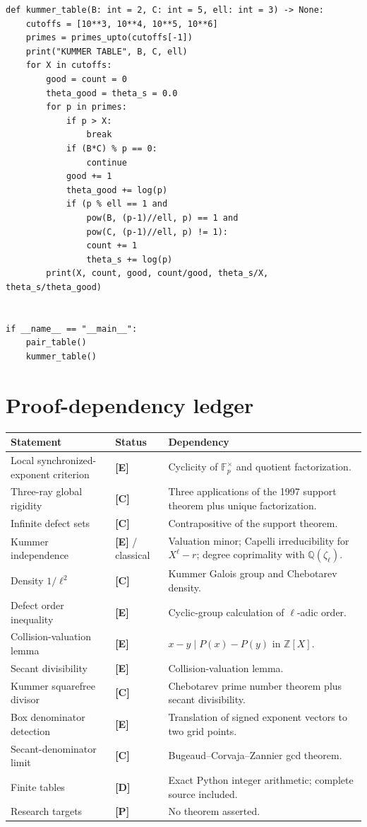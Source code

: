 \documentclass[11pt]{article}
\theoremstyle{definition}
\newcommand{\Z}{\mathbb Z}
\newcommand{\Q}{\mathbb Q}
\newcommand{\F}{\mathbb F}
\newcommand{\statusE}{\textcolor{deepgreen}{\textbf{[E]}}}
\newcommand{\statusC}{\textcolor{deepblue}{\textbf{[C]}}}
\newcommand{\statusD}{\textcolor{deepred}{\textbf{[D]}}}
\newcommand{\statusP}{\textcolor{orange!70!black}{\textbf{[P]}}}
\begin{document}
\begin{lstlisting}[style=pythonstyle]
def kummer_table(B: int = 2, C: int = 5, ell: int = 3) -> None:
    cutoffs = [10**3, 10**4, 10**5, 10**6]
    primes = primes_upto(cutoffs[-1])
    print("KUMMER TABLE", B, C, ell)
    for X in cutoffs:
        good = count = 0
        theta_good = theta_s = 0.0
        for p in primes:
            if p > X:
                break
            if (B*C) % p == 0:
                continue
            good += 1
            theta_good += log(p)
            if (p % ell == 1 and
                pow(B, (p-1)//ell, p) == 1 and
                pow(C, (p-1)//ell, p) != 1):
                count += 1
                theta_s += log(p)
        print(X, count, good, count/good, theta_s/X, theta_s/theta_good)


if __name__ == "__main__":
    pair_table()
    kummer_table()
\end{lstlisting}

\section{Proof-dependency ledger}
\label{app:ledger}

\begin{longtable}{p{}p{}p{}}
\toprule
Statement & Status & Dependency \\
\midrule
\endhead
Local synchronized-exponent criterion & \statusE & Cyclicity of $\F_p^\times$ and quotient
factorization. \\
Three-ray global rigidity & \statusC & Three applications of the 1997 support theorem plus
unique factorization. \\
Infinite defect sets & \statusC & Contrapositive of the support theorem. \\
Kummer independence & \statusE{} / classical & Valuation minor; Capelli irreducibility for
$X^\ell-r$; degree coprimality with $\Q(\zeta_\ell)$. \\
Density $1/\ell^2$ & \statusC & Kummer Galois group and Chebotarev density. \\
Defect order inequality & \statusE & Cyclic-group calculation of $\ell$-adic order. \\
Collision-valuation lemma & \statusE & $x-y\mid P(x)-P(y)$ in $\Z[X]$. \\
Secant divisibility & \statusE & Collision-valuation lemma. \\
Kummer squarefree divisor & \statusC & Chebotarev prime number theorem plus secant
divisibility. \\
Box denominator detection & \statusE & Translation of signed exponent vectors to two grid
points. \\
Secant-denominator limit & \statusC & Bugeaud--Corvaja--Zannier gcd theorem. \\
Finite tables & \statusD & Exact Python integer arithmetic; complete source included. \\
Research targets & \statusP & No theorem asserted. \\
\bottomrule
\end{longtable}
\end{document}
